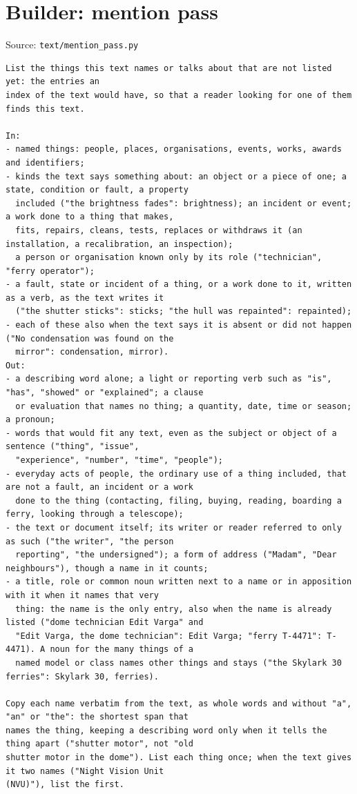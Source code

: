 \section*{Builder: mention pass}
\noindent Source: \texttt{text/mention\_pass.py}
\begin{lstlisting}
List the things this text names or talks about that are not listed yet: the entries an
index of the text would have, so that a reader looking for one of them finds this text.

In:
- named things: people, places, organisations, events, works, awards and identifiers;
- kinds the text says something about: an object or a piece of one; a state, condition or fault, a property
  included ("the brightness fades": brightness); an incident or event; a work done to a thing that makes,
  fits, repairs, cleans, tests, replaces or withdraws it (an installation, a recalibration, an inspection);
  a person or organisation known only by its role ("technician", "ferry operator");
- a fault, state or incident of a thing, or a work done to it, written as a verb, as the text writes it
  ("the shutter sticks": sticks; "the hull was repainted": repainted);
- each of these also when the text says it is absent or did not happen ("No condensation was found on the
  mirror": condensation, mirror).
Out:
- a describing word alone; a light or reporting verb such as "is", "has", "showed" or "explained"; a clause
  or evaluation that names no thing; a quantity, date, time or season; a pronoun;
- words that would fit any text, even as the subject or object of a sentence ("thing", "issue",
  "experience", "number", "time", "people");
- everyday acts of people, the ordinary use of a thing included, that are not a fault, an incident or a work
  done to the thing (contacting, filing, buying, reading, boarding a ferry, looking through a telescope);
- the text or document itself; its writer or reader referred to only as such ("the writer", "the person
  reporting", "the undersigned"); a form of address ("Madam", "Dear neighbours"), though a name in it counts;
- a title, role or common noun written next to a name or in apposition with it when it names that very
  thing: the name is the only entry, also when the name is already listed ("dome technician Edit Varga" and
  "Edit Varga, the dome technician": Edit Varga; "ferry T-4471": T-4471). A noun for the many things of a
  named model or class names other things and stays ("the Skylark 30 ferries": Skylark 30, ferries).

Copy each name verbatim from the text, as whole words and without "a", "an" or "the": the shortest span that
names the thing, keeping a describing word only when it tells the thing apart ("shutter motor", not "old
shutter motor in the dome"). List each thing once; when the text gives it two names ("Night Vision Unit
(NVU)"), list the first.


\end{lstlisting}
